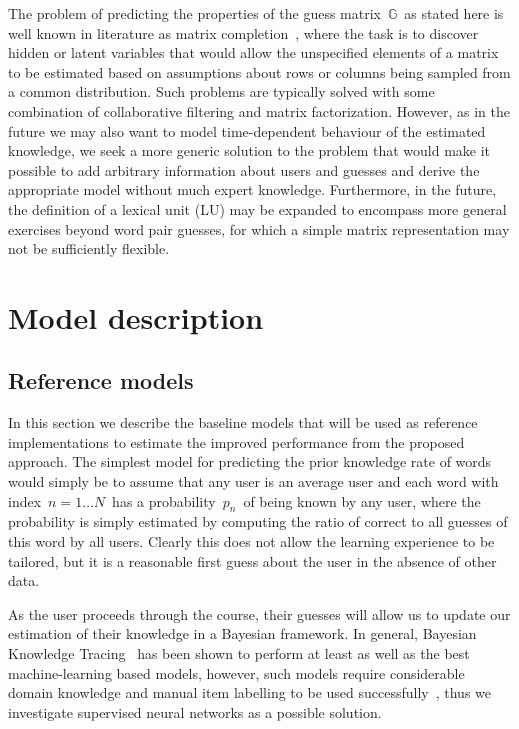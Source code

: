 The problem of predicting the properties of the guess matrix~$\mathbb{G}$~as stated here is well known in literature as matrix completion~\cite{candes2009exact}, where the task is to discover hidden or latent variables that would allow the unspecified elements of a matrix to be estimated based on assumptions about rows or columns being sampled from a common distribution. Such problems are typically solved with some combination of collaborative filtering and matrix factorization. However, as in the future we may also want to model time-dependent behaviour of the estimated knowledge, we seek a more generic solution to the problem that would make it possible to add arbitrary information about users and guesses and derive the appropriate model without much expert knowledge. Furthermore, in the future, the definition of a lexical unit (LU) may be expanded to encompass more general exercises beyond word pair guesses, for which a simple matrix representation may not be sufficiently flexible. 

\section{Model description}

\subsection{Reference models}

In this section we describe the baseline models that will be used as reference implementations to estimate the improved performance from the proposed approach. The simplest model for predicting the prior knowledge rate of words would simply be to assume that any user is an average user and each word with index~$n=1 \dots N$~has a probability~$p_n$~of being known by any user, where the probability is simply estimated by computing the ratio of correct to all guesses of this word by all users. Clearly this does not allow the learning experience to be tailored, but it is a reasonable first guess about the user in the absence of other data.

As the user proceeds through the course, their guesses will allow us to update our estimation of their knowledge in a Bayesian framework. In general, Bayesian Knowledge Tracing~\cite{corbett1994knowledge} has been shown to perform at least as well as the best machine-learning based models, however, such models require considerable domain knowledge and manual item labelling to be used successfully~\cite{khajah2016deep}, thus we investigate supervised neural networks as a possible solution.

